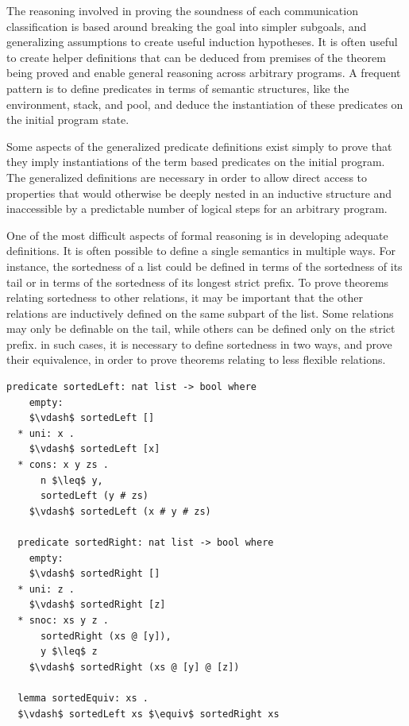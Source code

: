\documentclass[letterpaper, 11pt]{extarticle}
\begin{document}
The reasoning involved in proving the soundness of each communication classification
is based around breaking the goal into simpler subgoals, and generalizing assumptions to create
useful induction hypotheses. It is often useful to
create helper definitions that can be deduced
from premises of the theorem being proved and enable
general reasoning across arbitrary programs.
A frequent pattern is to define
predicates in terms of semantic structures, like the environment, stack, and pool, and deduce 
the instantiation of these predicates on the initial program state. 

Some aspects of the generalized predicate definitions exist simply to prove that they imply
instantiations of the term based predicates on the initial program. The generalized
definitions are necessary in order to allow direct access to properties that would
otherwise be deeply nested
in an inductive structure and inaccessible by a predictable number of
logical steps for an arbitrary program.

One of the most difficult aspects of formal reasoning is in developing adequate definitions.
It is often possible to define a single semantics in multiple ways.
For instance, the sortedness of a list could be defined in terms of the sortedness of its tail
or in terms of the sortedness of its longest strict prefix. To prove theorems relating
sortedness to other relations, it may be important that the other relations are inductively
defined on the same subpart of the list. Some relations may only be definable on the tail,
while others can be defined only on the strict prefix. in such cases, it is necessary to
define sortedness in two ways, and prove their equivalence, in order to prove theorems relating
to less flexible relations.

\begin{lstlisting}[language=logic, mathescape]
  predicate sortedLeft: nat list -> bool where
    empty:
    $\vdash$ sortedLeft []
  * uni: x .
    $\vdash$ sortedLeft [x]
  * cons: x y zs .
      n $\leq$ y,
      sortedLeft (y # zs)
    $\vdash$ sortedLeft (x # y # zs)

  predicate sortedRight: nat list -> bool where
    empty:
    $\vdash$ sortedRight []
  * uni: z .
    $\vdash$ sortedRight [z]
  * snoc: xs y z .
      sortedRight (xs @ [y]),
      y $\leq$ z 
    $\vdash$ sortedRight (xs @ [y] @ [z])

  lemma sortedEquiv: xs .
  $\vdash$ sortedLeft xs $\equiv$ sortedRight xs  
\end{lstlisting}
\end{document}
